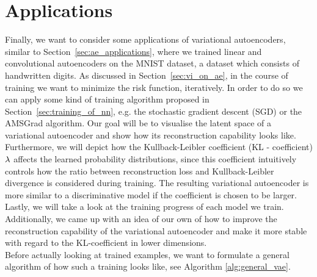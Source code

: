 \section{Applications}\label{sec:vae_applications}

Finally, we want to consider some applications of variational autoencoders, similar to Section~\ref{sec:ae_applications}, where we trained linear and convolutional autoencoders on the MNIST dataset, a dataset which consists of handwritten digits. As discussed in Section~\ref{sec:vi_on_ae}, in the course of training we want to minimize the risk function, iteratively. In order to do so we can apply some kind of training algorithm proposed in Section~\ref{sec:training_of_nn}, e.g. the stochastic gradient descent (SGD) or the AMSGrad algorithm. Our goal will be to visualise the latent space of a variational autoencoder and show how its reconstruction capability looks like. Furthermore, we will depict how the Kullback-Leibler coefficient (KL - coefficient) $\lambda$ affects the learned probability distributions, since this coefficient intuitively controls how the ratio between reconstruction loss and Kullback-Leibler divergence is considered during training. The resulting variational autoencoder is \glqq more similar\grqq{} to a discriminative model if the coefficient is chosen to be larger. Lastly, we will take a look at the training progress of each model we train. Additionally, we came up with an idea of our own of how to improve the reconstruction capability of the variational autoencoder and make it more stable with regard to the KL-coefficient  in lower dimensions.\\
Before actually looking at trained examples, we want to formulate a general algorithm of how such a training looks like, see Algorithm \ref{alg:general_vae}.

